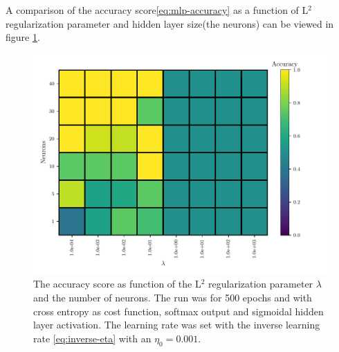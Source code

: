 A comparison of the accuracy score\eqref{eq:mlp-accuracy} as a function of L$^2$ regularization parameter and hidden layer size(the neurons) can be viewed in figure \ref{fig:mlp-lambda-neurons}.
\begin{figure}[H]
    \centering
    \includegraphics[scale=1.0]{../fig/mlp_lambda_neurons.pdf}
    \caption{The accuracy score as function of the L$^2$ regularization parameter $\lambda$ and the number of neurons. The run was for 500 epochs and with cross entropy as cost function, softmax output and sigmoidal hidden layer activation. The learning rate was set with the inverse learning rate \eqref{eq:inverse-eta} with an $\eta_0=0.001$.}
    \label{fig:mlp-lambda-neurons}
\end{figure}

